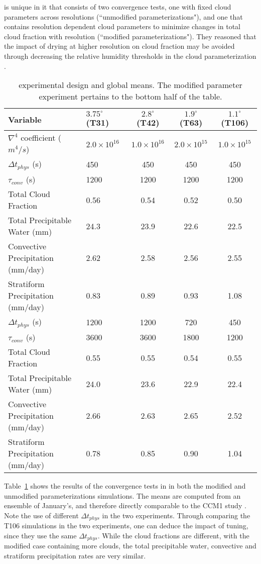 \cite{WETAL1995CD} is unique in it that consists of two convergence tests, one with fixed cloud parameters across resolutions (``unmodified parameterizations"), and one that contains resolution dependent cloud parameters to minimize changes in total cloud fraction with resolution (``modified parameterizations"). They reasoned that the impact of drying at higher resolution on cloud fraction may be avoided through decreasing the relative humidity thresholds in the cloud parameterization \citep{KETAL1994JGR}. 

 \begin{table}
 \caption{\cite{WETAL1995CD} experimental design and global means. The modified parameter experiment pertains to the bottom half of the table.}
 \centering
 \scriptsize
 \begin{tabular}{llccc}
 \hline
 Variable & $3.75^{\circ}$ (T31) & $2.8^{\circ}$ (T42) & $1.9^{\circ}$ (T63)  & $1.1^{\circ}$ (T106) \\
 \hline
   $\nabla^{4}$ coefficient ($m^4/s$) & $2.0 \times 10^{16}$ & $1.0 \times 10^{16}$ & $2.0 \times 10^{15}$ & $1.0 \times 10^{15}$ \\
   $\Delta t_{phys}$ (s) & 450 & 450 & 450 & 450 \\
   $\tau_{conv}$ (s) & 1200 & 1200 & 1200 & 1200 \\   
   Total Cloud Fraction & 0.56 & 0.54 & 0.52 & 0.50 \\
   Total Precipitable Water (mm) & 24.3 & 23.9 & 22.6 & 22.5 \\
   Convective Precipitation (mm/day) & 2.62 & 2.58 & 2.56 & 2.55 \\
   Stratiform Precipitation (mm/day) & 0.83 & 0.89 & 0.93 & 1.08 \\  
   \hline
   $\Delta t_{phys}$ (s) & 1200 & 1200 & 720 & 450 \\
   $\tau_{conv}$ (s) & 3600 & 3600 & 1800 & 1200 \\
   Total Cloud Fraction & 0.55 & 0.55 & 0.54 & 0.55 \\
   Total Precipitable Water (mm) & 24.0 & 23.6 & 22.9 & 22.4 \\
   Convective Precipitation (mm/day) & 2.66 & 2.63 & 2.65 & 2.52 \\
   Stratiform Precipitation (mm/day) & 0.78 & 0.85 & 0.90 & 1.04 \\    
 \hline
 \end{tabular}
 \label{tbl:table1-2}
 \end{table}

Table~\ref{tbl:table1-2} shows the results of the convergence tests in \cite{WETAL1995CD} in both the modified and unmodified parameterizations simulations. The means are computed from an ensemble of January's, and therefore directly comparable to the CCM1 study \citep{KW1991JGR}. Note the use of different $\Delta t_{phys}$ in the two experiments. Through comparing the T106 simulations in the two experiments, one can deduce the impact of tuning, since they use the same $\Delta t_{phys}$. While the cloud fractions are different, with the modified case containing more clouds, the total precipitable water, convective and stratiform precipitation rates are very similar. 

